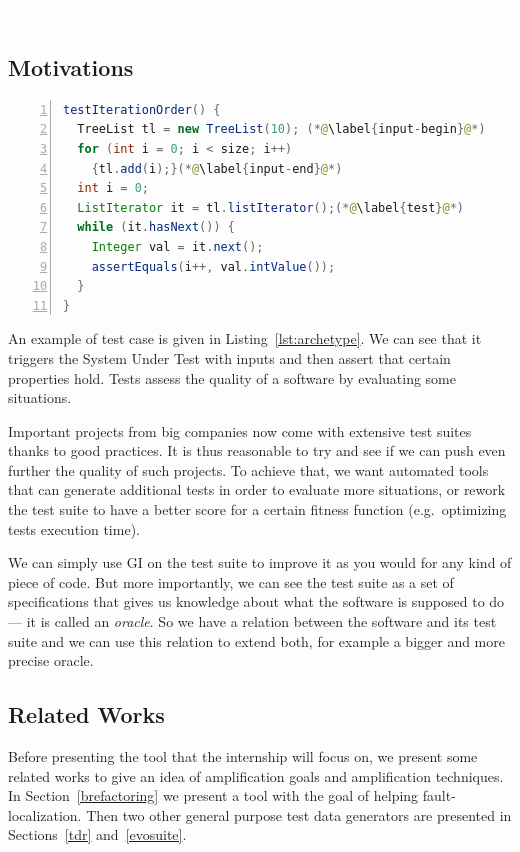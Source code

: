 \documentclass[11pt]{sdm}
\newcommand{\addref}[1]{\colorbox{TealBlue!100}{\textcolor{white}{\textbf{$[$\ifx&#1&\ \else#1\fi$]$}}}}
\begin{document}
\addref{new survey paper}

\subsection{Motivations}
\label{motiv_tsa}

\begin{lstlisting}[caption={An archetypal example of an object-oriented test case  (taken from the Apache Commons Collections, in the class TreeListTest, line 270)},label=lst:archetype,float,language=java,numbers=left]
testIterationOrder() {
  TreeList tl = new TreeList(10); (*@\label{input-begin}@*)
  for (int i = 0; i < size; i++)
    {tl.add(i);}(*@\label{input-end}@*)
  int i = 0;
  ListIterator it = tl.listIterator();(*@\label{test}@*)
  while (it.hasNext()) {
    Integer val = it.next();
    assertEquals(i++, val.intValue());
  }
}
\end{lstlisting}

An example of test case is given in Listing~\ref{lst:archetype}.
We can see that it triggers the System Under Test with inputs and then assert that certain properties hold.
Tests assess the quality of a software by evaluating some situations.

Important projects from big companies now come with extensive test suites thanks to good practices.
It is thus reasonable to try and see if we can push even further the quality of such projects.
To achieve that, we want automated tools that can generate additional tests in order to evaluate more situations, or rework the test suite to have a better score for a certain fitness function (e.g.\ optimizing tests execution time).

We can simply use GI on the test suite to improve it as you would for any kind of piece of code.
But more importantly, we can see the test suite as a set of specifications that gives us knowledge about what the software is supposed to do --- it is called an \textit{oracle}.
So we have a relation between the software and its test suite and we can use this relation to extend both, for example a bigger and more precise oracle.


\subsection{Related Works}
\label{related}
Before presenting the tool that the internship will focus on, we present some related works to give an idea of amplification goals and amplification techniques.
In Section~\ref{brefactoring} we present a tool with the goal of helping fault-localization.
Then two other general purpose test data generators are presented in Sections~\ref{tdr} and~\ref{evosuite}.
\end{document}
